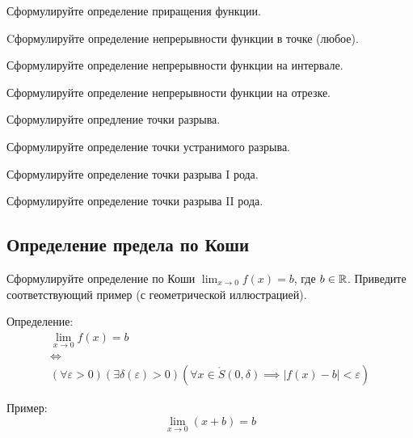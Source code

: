 \begin{question}
  Сформулируйте определение приращения функции. 
\end{question}

\begin{question}
  Cформулируйте определение непрерывности функции в точке (любое). 
\end{question}

\begin{question}
  Сформулируйте определение непрерывности функции на интервале.
\end{question}

\begin{question}
  Сформулируйте определение непрерывности функции на отрезке.
\end{question}

\begin{question}
  Сформулируйте опредление точки разрыва.
\end{question}

\begin{question}
  Сформулируйте определение точки устранимого разрыва.
\end{question}

\begin{question}
  Сформулируйте определение точки разрыва I рода.
\end{question}

\begin{question}
  Сформулируйте определение точки разрыва II рода.
\end{question}


\subsection{Определение предела по Коши}

\begin{question}
  Сформулируйте определение по Коши $\lim_{x \to 0} f(x) = b$, где $b \in \mathbb{R}$.
Приведите соответствующий пример (с геометрической иллюстрацией).
\end{question}
\begin{answer}
  Определение:
  \begin{gather*}
    \lim_{x \to 0} f(x) = b \\
    \iff \\
    (\forall \varepsilon > 0)(\exists \delta(\varepsilon) > 0)(\forall x \in \mathring{S}(0, \delta) \implies |f(x) - b| < \varepsilon)
  \end{gather*}

  Пример: \[
    \lim_{x \to 0} (x + b) = b  
  \] 
\end{answer}


